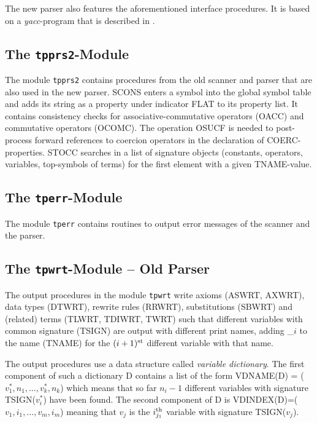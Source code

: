 The new parser also features the aforementioned interface procedures.
It is based on a {\it yacc}-program that is described in \NPPG.

\subsection{The {\tt tpprs2}-Module}

The module {\tt tpprs2} contains procedures from the old scanner and 
parser that are also used in the new parser.
SCONS enters a symbol into the global symbol table and adds its string as
a property under indicator FLAT to its property list.
It contains consistency checks for associative-commutative operators
(OACC) and commutative operators (OCOMC).
The operation OSUCF is needed to post-process forward references to
coercion operators in the declaration of COERC-properties.
STOCC searches in a list of signature objects (constants, operators, variables,
top-symbols of terms)
for the first element with a given TNAME-value.

\subsection{The {\tt tperr}-Module}

The module {\tt tperr} contains routines to output error messages of the scanner
and the parser.

\subsection{The {\tt tpwrt}-Module -- Old Parser}

The output procedures in the module {\tt tpwrt} write axioms
(ASWRT, AXWRT), data types (DTWRT), rewrite rules (RRWRT),
substitutions (SBWRT) and (related) terms (TLWRT, TDIWRT, TWRT)
such that different variables with common signature (TSIGN) are output
with different print names, adding \_$i$ to the name (TNAME) for the
$(i+1)^{\mbox{\scriptsize st}}$ different variable with that name.

The output procedures use a data structure called {\em variable dictionary}.
The first component of such a dictionary D contains a list of the form
VDNAME(D) = ($v^*_1,n_1, \ldots, v^*_k,n_k$) which means that so far $n_i-1$
different variables with signature TSIGN($v^*_i$) have been found.
The second component of D is VDINDEX(D)=($v_1,i_1, \ldots, v_m,i_m$)
meaning that $v_j$ is the $i_{j_1}^{\mbox{\scriptsize th}}$ variable with
signature TSIGN($v_j$).

